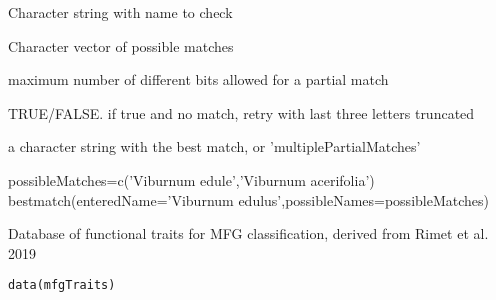 \documentclass[a4paper]{book}
\begin{document}
%
\begin{Arguments}
\begin{ldescription}
\item[\code{enteredName}] Character string with name to check

\item[\code{possibleNames}] Character vector of possible matches

\item[\code{maxErr}] maximum number of different bits allowed for a partial match

\item[\code{trunc}] TRUE/FALSE. if true and no match, retry with last three letters truncated
\end{ldescription}
\end{Arguments}
%
\begin{Value}
a character string with the best match, or 'multiplePartialMatches'
\end{Value}
%
\begin{Examples}
\begin{ExampleCode}
possibleMatches=c('Viburnum edule','Viburnum acerifolia')
bestmatch(enteredName='Viburnum edulus',possibleNames=possibleMatches)
\end{ExampleCode}
\end{Examples}
%
\begin{Description}\relax
Database of functional traits for MFG classification, derived from Rimet et al. 2019
\end{Description}
%
\begin{Usage}
\begin{verbatim}
data(mfgTraits)
\end{verbatim}
\end{Usage}
%
\end{document}
